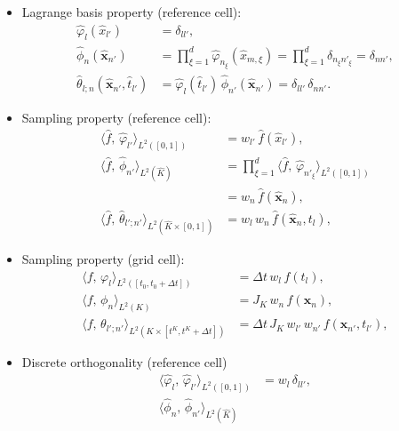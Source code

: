 \documentclass{scrreprt}
\theoremstyle{definition}
\theoremstyle{nonumberplain}
\renewcommand{\vec}[1]{{\textbf{#1}}}
\newcommand{\cell}{K}
\newcommand{\refVec}[1]{\hat{\vec{#1}}}
\newcommand{\refCell}{\hat{\cell}}
\newcommand{\detJ}{J_\cell}
\begin{document}
\begin{itemize}
  \item Lagrange basis property (reference cell):
  \begin{align}
\label{eq:ader_impl:basis:lagrange_ref_1d}
{\hat{\varphi}}_{l} (\hat{x}_{l'}) &= \delta_{ll'},\\
{\hat{\phi}}_{n} (\refVec{x}_{n'}) &= \prod_{\xi=1}^d
{\hat{\varphi}}_{n_{\xi}} (\hat{x}_{m,\xi})
=
\prod_{\xi=1}^{d}
\delta_{n_\xi n'_\xi}
= \delta_{n n'},
\\
{\hat{\theta}}_{l;n} (\refVec{x}_{n'},\hat{t}_{l'}) &=
\hat{\varphi}_{l}(\hat{t}_{l'})\,{\hat{\phi}}_{n'} (\refVec{x}_{n'})
= \delta_{l l'}\,\delta_{n n'}.
\end{align}
\item Sampling property (reference cell):
\begin{align}
\label{eq:ader_impl:basis:sampling_ref_1d}
\langle \hat{f},\,\hat{\varphi}_{l'}\rangle_{L^2([0,1])}   &=
w_{l'}\,\hat{f}(\hat{x}_{l'}),
\\
\langle \hat{f},\,\hat{\phi}_{n'}\rangle_{L^2(\refCell)}
&=
\prod_{\xi=1}^d
\langle \hat{f},\,\hat{\varphi}_{n'_\xi}\rangle_{L^2([0,1])}
\\
&=
w_{n}\,
\hat{f}(\refVec{x}_n),
\\
\langle\hat{f},\,\hat{\theta}_{l';n'}\rangle
_{L^2(\refCell\times[0,1])}
&= w_{l}\,w_{n}\,
\hat{f}(\refVec{x}_n,t_l),
\end{align}
\item Sampling property (grid cell):
\begin{align}
\label{eq:ader_impl:basis:sampling_grid_1d}
\langle f,\,\varphi_{l}\rangle_{L^2([t_0,t_0+\Delta t])}   &=
\Delta t\,w_l\,f(t_l),
\\
\label{eq:ader_impl:basis:sampling_grid_3d}
\langle f,\,\phi_{n}\rangle_{L^2(\cell)}
&=
\detJ\,
w_{n}\,
f(\vec{x}_n),
\\
\langle f,\,\theta_{l';n'}\rangle
_{L^2(\cell\times[t^\cell,t^\cell+\Delta t])}
&=
\Delta t\,\detJ\,
w_{l'}\,w_{n'}\,
f(\vec{x}_{n'},t_{l'}),
\end{align}
\item Discrete orthogonality (reference cell)
\begin{align}
\label{eq:ader_impl:basis:discrete_ortho_ref_1d}
\langle \hat{\varphi}_{l},\,\hat{\varphi}_{l'}\rangle_{L^2([0,1])}   &=
w_l\,\delta_{ll'},
\\
\label{eq:ader_impl:basis:discrete_ortho_ref_3d}
\langle \hat{\phi}_{n},\,\hat{\phi}_{n'}\rangle_{L^2(\refCell)}

\end{align}
\end{itemize}
\end{document}
